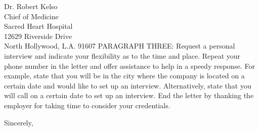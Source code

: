\documentclass[12pt]{letter} %
\begin{document}
\begin{letter}{
	Dr. Robert Kelso \\
	Chief of Medicine \\
	Sacred Heart Hospital \\
	12629 Riverside Drive \\
	North Hollywood, L.A. 91607
}
PARAGRAPH THREE: Request a personal interview and indicate your flexibility as to the time and place. Repeat your phone number in the letter and offer assistance to help in a speedy response. For example, state that you will be in the city where the company is located on a certain date and would like to set up an interview. Alternatively, state that you will call on a certain date to set up an interview. End the letter by thanking the employer for taking time to consider your credentials.

\closing{Sincerely,}




\end{letter}
\end{document}
